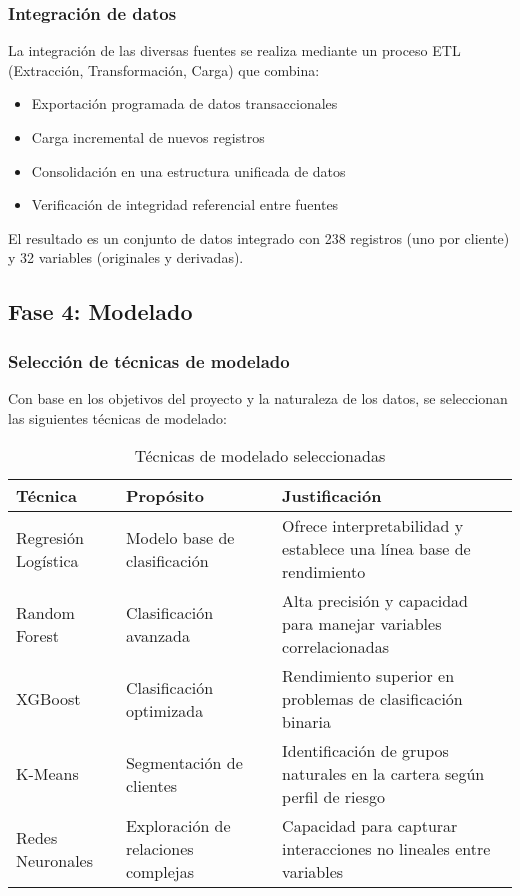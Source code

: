 \subsubsection{Integración de datos}
La integración de las diversas fuentes se realiza mediante un proceso ETL (Extracción, Transformación, Carga) que combina:

\begin{itemize}
    \item Exportación programada de datos transaccionales
    \item Carga incremental de nuevos registros
    \item Consolidación en una estructura unificada de datos
    \item Verificación de integridad referencial entre fuentes
\end{itemize}

El resultado es un conjunto de datos integrado con 238 registros (uno por cliente) y 32 variables (originales y derivadas).

\subsection{Fase 4: Modelado}
\subsubsection{Selección de técnicas de modelado}
Con base en los objetivos del proyecto y la naturaleza de los datos, se seleccionan las siguientes técnicas de modelado:

\begin{table}[ht]
\centering
\begin{tabular}{|p{3.5cm}|p{3.5cm}|p{7cm}|}
\hline
\textbf{Técnica} & \textbf{Propósito} & \textbf{Justificación} \\
\hline
Regresión Logística & Modelo base de clasificación & Ofrece interpretabilidad y establece una línea base de rendimiento \\
\hline
Random Forest & Clasificación avanzada & Alta precisión y capacidad para manejar variables correlacionadas \\
\hline
XGBoost & Clasificación optimizada & Rendimiento superior en problemas de clasificación binaria \\
\hline
K-Means & Segmentación de clientes & Identificación de grupos naturales en la cartera según perfil de riesgo \\
\hline
Redes Neuronales & Exploración de relaciones complejas & Capacidad para capturar interacciones no lineales entre variables \\
\hline
\end{tabular}
\caption{Técnicas de modelado seleccionadas}
\end{table}


